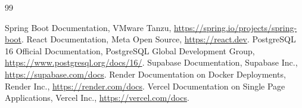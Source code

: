 \documentclass[12pt,a4paper,oneside]{report}
\begin{document}
\newpage
\begin{thebibliography}{99}

 Spring Boot Documentation, VMware Tanzu, \url{https://spring.io/projects/spring-boot}.
 React Documentation, Meta Open Source, \url{https://react.dev}.
 PostgreSQL 16 Official Documentation, PostgreSQL Global Development Group, \url{https://www.postgresql.org/docs/16/}.
 Supabase Documentation, Supabase Inc., \url{https://supabase.com/docs}.
 Render Documentation on Docker Deployments, Render Inc., \url{https://render.com/docs}.
 Vercel Documentation on Single Page Applications, Vercel Inc., \url{https://vercel.com/docs}.

\end{thebibliography}
\end{document}
